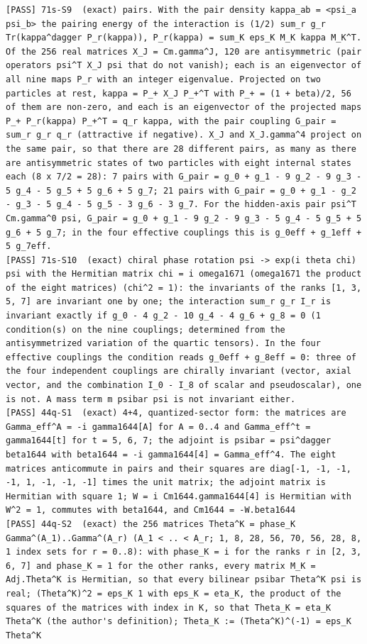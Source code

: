 \documentclass[
  10pt,
]{article}
\begin{document}
\begin{verbatim}
[PASS] 71s-S9  (exact) pairs. With the pair density kappa_ab = <psi_a psi_b> the pairing energy of the interaction is (1/2) sum_r g_r Tr(kappa^dagger P_r(kappa)), P_r(kappa) = sum_K eps_K M_K kappa M_K^T. Of the 256 real matrices X_J = Cm.gamma^J, 120 are antisymmetric (pair operators psi^T X_J psi that do not vanish); each is an eigenvector of all nine maps P_r with an integer eigenvalue. Projected on two particles at rest, kappa = P_+ X_J P_+^T with P_+ = (1 + beta)/2, 56 of them are non-zero, and each is an eigenvector of the projected maps P_+ P_r(kappa) P_+^T = q_r kappa, with the pair coupling G_pair = sum_r g_r q_r (attractive if negative). X_J and X_J.gamma^4 project on the same pair, so that there are 28 different pairs, as many as there are antisymmetric states of two particles with eight internal states each (8 x 7/2 = 28): 7 pairs with G_pair = g_0 + g_1 - 9 g_2 - 9 g_3 - 5 g_4 - 5 g_5 + 5 g_6 + 5 g_7; 21 pairs with G_pair = g_0 + g_1 - g_2 - g_3 - 5 g_4 - 5 g_5 - 3 g_6 - 3 g_7. For the hidden-axis pair psi^T Cm.gamma^0 psi, G_pair = g_0 + g_1 - 9 g_2 - 9 g_3 - 5 g_4 - 5 g_5 + 5 g_6 + 5 g_7; in the four effective couplings this is g_0eff + g_1eff + 5 g_7eff.
[PASS] 71s-S10  (exact) chiral phase rotation psi -> exp(i theta chi) psi with the Hermitian matrix chi = i omega1671 (omega1671 the product of the eight matrices) (chi^2 = 1): the invariants of the ranks [1, 3, 5, 7] are invariant one by one; the interaction sum_r g_r I_r is invariant exactly if g_0 - 4 g_2 - 10 g_4 - 4 g_6 + g_8 = 0 (1 condition(s) on the nine couplings; determined from the antisymmetrized variation of the quartic tensors). In the four effective couplings the condition reads g_0eff + g_8eff = 0: three of the four independent couplings are chirally invariant (vector, axial vector, and the combination I_0 - I_8 of scalar and pseudoscalar), one is not. A mass term m psibar psi is not invariant either.
[PASS] 44q-S1  (exact) 4+4, quantized-sector form: the matrices are Gamma_eff^A = -i gamma1644[A] for A = 0..4 and Gamma_eff^t = gamma1644[t] for t = 5, 6, 7; the adjoint is psibar = psi^dagger beta1644 with beta1644 = -i gamma1644[4] = Gamma_eff^4. The eight matrices anticommute in pairs and their squares are diag[-1, -1, -1, -1, 1, -1, -1, -1] times the unit matrix; the adjoint matrix is Hermitian with square 1; W = i Cm1644.gamma1644[4] is Hermitian with W^2 = 1, commutes with beta1644, and Cm1644 = -W.beta1644
[PASS] 44q-S2  (exact) the 256 matrices Theta^K = phase_K Gamma^(A_1)..Gamma^(A_r) (A_1 < .. < A_r; 1, 8, 28, 56, 70, 56, 28, 8, 1 index sets for r = 0..8): with phase_K = i for the ranks r in [2, 3, 6, 7] and phase_K = 1 for the other ranks, every matrix M_K = Adj.Theta^K is Hermitian, so that every bilinear psibar Theta^K psi is real; (Theta^K)^2 = eps_K 1 with eps_K = eta_K, the product of the squares of the matrices with index in K, so that Theta_K = eta_K Theta^K (the author's definition); Theta_K := (Theta^K)^(-1) = eps_K Theta^K

\end{verbatim}
\end{document}
